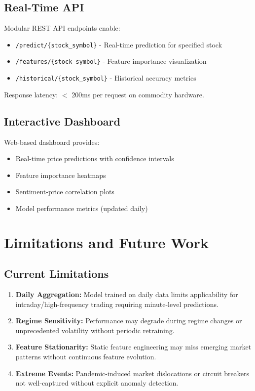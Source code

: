 \documentclass[conference]{IEEEtran}
\begin{document}
\subsection{Real-Time API}

Modular REST API endpoints enable:

\begin{itemize}
\item \texttt{/predict/\{stock\_symbol\}} - Real-time prediction for specified stock
\item \texttt{/features/\{stock\_symbol\}} - Feature importance visualization
\item \texttt{/historical/\{stock\_symbol\}} - Historical accuracy metrics
\end{itemize}

Response latency: $<$ 200ms per request on commodity hardware.

\subsection{Interactive Dashboard}

Web-based dashboard provides:
\begin{itemize}
\item Real-time price predictions with confidence intervals
\item Feature importance heatmaps
\item Sentiment-price correlation plots
\item Model performance metrics (updated daily)
\end{itemize}

\section{Limitations and Future Work}

\subsection{Current Limitations}

\begin{enumerate}
\item \textbf{Daily Aggregation:} Model trained on daily data limits applicability for intraday/high-frequency trading requiring minute-level predictions.

\item \textbf{Regime Sensitivity:} Performance may degrade during regime changes or unprecedented volatility without periodic retraining.

\item \textbf{Feature Stationarity:} Static feature engineering may miss emerging market patterns without continuous feature evolution.

\item \textbf{Extreme Events:} Pandemic-induced market dislocations or circuit breakers not well-captured without explicit anomaly detection.
\end{enumerate}
\end{document}
